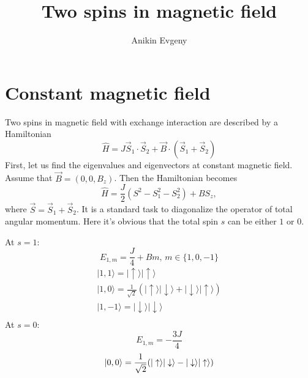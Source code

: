 \documentclass{article}
\title{Two spins in magnetic field}
\author{Anikin Evgeny}
\begin{document}
\maketitle
\section{Constant magnetic field}
Two spins in magnetic field with exchange interaction are described by a Hamiltonian
\begin{equation}
    \hat{H} = J\vec{S}_1\cdot\vec{S}_2 + \vec{B}\cdot(\vec{S}_1+\vec{S}_2)
\end{equation}
First, let us find the eigenvalues and eigenvectors at constant magnetic field. Assume that
$\vec{B} = (0, 0, B_z)$. Then the Hamiltonian becomes
\begin{equation}
    \hat{H} = \frac{J}{2}( S^2 - S_1^2 - S_2^2) + 
                B S_z,
\end{equation}
where $\vec{S} = \vec{S}_1 + \vec{S}_2$.
It is a standard task to diagonalize the operator of total angular momentum. Here it's obvious
that the total spin $s$ can be either $1$ or $0$.

At $s = 1$:
\begin{equation}
    E_{1,m} = \frac{J}{4} + Bm, \, m \in \{1,0,-1\}
\end{equation}
\begin{equation}
    \begin{gathered}
        |1,1\rangle = |\uparrow\rangle |\uparrow \rangle\\
        |1,0\rangle = \frac{1}{\sqrt{2}}(|\uparrow\rangle |\downarrow \rangle + 
                                        |\downarrow\rangle |\uparrow \rangle)\\
        |1,-1\rangle = |\downarrow\rangle |\downarrow \rangle\\
    \end{gathered}
\end{equation}
At $s = 0$:
\begin{equation}
    E_{1,m} = -\frac{3J}{4}
\end{equation}
\begin{equation}
        |0,0\rangle = \frac{1}{\sqrt{2}}(|\uparrow\rangle |\downarrow \rangle - 
                                        |\downarrow\rangle |\uparrow \rangle)\\
\end{equation}
\end{document}
